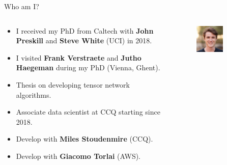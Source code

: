 \begin{frame}{Who am I?}

\begin{columns}

  \begin{column}[T, onlytextwidth]{.6\textwidth}%

    \setlength{\partopsep}{0pt}%

    \begin{itemize}[<+->]

      \item I received my PhD from Caltech with \textbf{John Preskill} and \textbf{Steve White} (UCI) in 2018.
      \item I visited \textbf{Frank Verstraete} and \textbf{Jutho Haegeman} during my PhD (Vienna, Ghent).
      \item Thesis on developing tensor network algorithms.
      \item Associate data scientist at CCQ starting since 2018.
      \item Develop  with \textbf{Miles Stoudenmire} (CCQ).
      \item Develop  with \textbf{Giacomo Torlai} (AWS).

    \end{itemize}

  \end{column}

  \begin{column}[T]{0.3\textwidth}

    \begin{figure}[T]

      \includegraphics[width=0.6\textwidth]{
        slides/assets/who-am-i-fishman.jpg
      }
      \caption{}


\end{figure}
\end{column}
\end{columns}
\end{frame}
